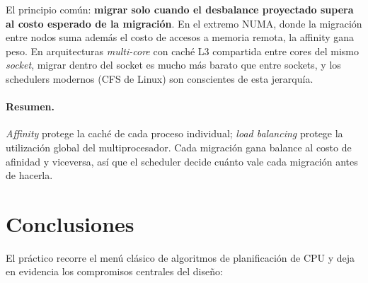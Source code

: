 \documentclass[11pt,a4paper]{article}
\begin{document}
El principio común: \textbf{migrar solo cuando el desbalance
proyectado supera al costo esperado de la migración}. En el extremo
NUMA, donde la migración entre nodos suma además el costo de
accesos a memoria remota, la affinity gana peso. En arquitecturas
\emph{multi-core} con caché L3 compartida entre cores del mismo
\emph{socket}, migrar dentro del socket es mucho más barato que
entre sockets, y los schedulers modernos (CFS de Linux) son
conscientes de esta jerarquía.

\paragraph{Resumen.} \emph{Affinity} protege la caché de cada
proceso individual; \emph{load balancing} protege la utilización
global del multiprocesador. Cada migración gana balance al costo de
afinidad y viceversa, así que el scheduler decide cuánto vale cada
migración antes de hacerla.

\section{Conclusiones}

El práctico recorre el menú clásico de algoritmos de planificación de
CPU y deja en evidencia los compromisos centrales del diseño:
\end{document}
